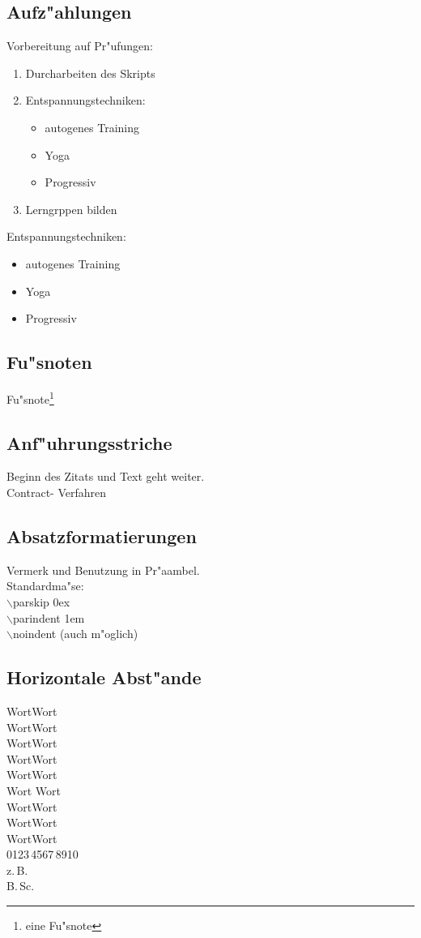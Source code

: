 \documentclass[a4paper,12pt,titlepage]{article} %
\begin{document}
\subsection{Aufz"ahlungen}
Vorbereitung auf Pr"ufungen:
\begin{enumerate}
 \item Durcharbeiten des Skripts
 \item Entspannungstechniken:
 \begin {itemize}
  \item autogenes Training
  \item Yoga
  \item Progressiv
 \end {itemize}
  \item Lerngrppen bilden
\end{enumerate}
Entspannungstechniken:
\begin {itemize}
 \item autogenes Training
 \item Yoga
 \item Progressiv
\end {itemize}

\subsection{Fu"snoten}
Fu"snote\footnote[1]{eine Fu"snote}

\subsection{Anf"uhrungsstriche}
\glqq Beginn des Zitats \grqq{} und Text geht weiter.\\
\glq Contract\grq - Verfahren

\subsection{Absatzformatierungen}
Vermerk und Benutzung in Pr"aambel.\\
Standardma"se: \\
$\backslash$parskip 0ex \\
$\backslash$parindent 1em \\
$\backslash$noindent (auch m"oglich)\\

\subsection{Horizontale Abst"ande}
Wort\negthickspace Wort\\
Wort\negmedspace Wort\\
Wort\negthinspace Wort\\
Wort\thinspace Wort\\
Wort\medspace Wort\\
Wort Wort\\
Wort\thickspace Wort\\
Wort\quad Wort\\
Wort\qquad Wort\\
0123\,4567\,8910\\
z.\,B.\\
B.\,Sc.\\
\end{document}
